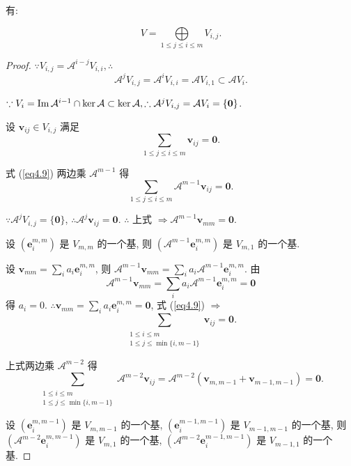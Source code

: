 \documentclass{ctexart}
\begin{document}
有:
\begin{theorem}\label{t4.3}
    \[V=\bigoplus\limits_{1\leq j\leq i\leq m}V_{i,j}.\]
\end{theorem}
\begin{proof}
    $\because V_{i,j}=\mathcal{A}^{i-j}V_{i,i},\therefore$
    \[\mathcal{A}^jV_{i,j}=\mathcal{A}^iV_{i,i}=\mathcal{A}V_{i,1}\subset\mathcal{A}V_i.\]

    $\because V_i=\operatorname{Im} \mathcal{A}^{i-1}\cap\ker\mathcal{A}\subset\ker\mathcal{A},\therefore\mathcal{A}^jV_{i,j}=\mathcal{A}V_i=\{\boldsymbol{0}\}$.

    设 $\boldsymbol{v}_{ij}\in V_{i,j}$ 满足
    \begin{equation}\label{eq4.9}
        \sum\limits_{1\leq j\leq i\leq m}\boldsymbol{v}_{ij}=\boldsymbol{0}.
    \end{equation}

    式 (\ref{eq4.9}) 两边乘 $\mathcal{A}^{m-1}$ 得
    \[\sum\limits_{1\leq j\leq i\leq m}\mathcal{A}^{m-1}\boldsymbol{v}_{ij}=\boldsymbol{0}.\]

    $\because\mathcal{A}^jV_{i,j}=\{\boldsymbol{0}\}$, $\therefore\mathcal{A}^j\boldsymbol{v}_{ij}=\boldsymbol{0}$. $\therefore$ 上式 $\Rightarrow\mathcal{A}^{m-1}\boldsymbol{v}_{mm}=\boldsymbol{0}$.

    设 $(\boldsymbol{e}_i^{m,m})$ 是 $V_{m,m}$ 的一个基, 则 $(\mathcal{A}^{m-1}\boldsymbol{e}_i^{m,m})$ 是 $V_{m,1}$ 的一个基.
    
    设 $\boldsymbol{v}_{mm}=\sum\limits_ia_i\boldsymbol{e}_i^{m,m}$, 则 $\mathcal{A}^{m-1}\boldsymbol{v}_{mm}=\sum\limits_ia_i\mathcal{A}^{m-1}\boldsymbol{e}_i^{m,m}$. 由
    \[\mathcal{A}^{m-1}\boldsymbol{v}_{mm}=\sum\limits_ia_i\mathcal{A}^{m-1}\boldsymbol{e}_i^{m,m}=\boldsymbol{0}\]
    得 $a_i=0$. $\therefore \boldsymbol{v}_{mm}=\sum\limits_ia_i\boldsymbol{e}_i^{m,m}=\boldsymbol{0}$, 式 (\ref{eq4.9}) $\Rightarrow$
    \[\sum\limits_{\substack{1\leq i\leq m\\1\leq j\leq\min\{i,m-1\}}}\boldsymbol{v}_{ij}=\boldsymbol{0}.\]
    
    上式两边乘 $\mathcal{A}^{m-2}$ 得
    \[\sum\limits_{\substack{1\leq i\leq m\\1\leq j\leq\min\{i,m-1\}}}\mathcal{A}^{m-2}\boldsymbol{v}_{ij}=\mathcal{A}^{m-2}(\boldsymbol{v}_{m,m-1}+\boldsymbol{v}_{m-1,m-1})=\boldsymbol{0}.\]

    设 $(\boldsymbol{e}_i^{m,m-1})$ 是 $V_{m,m-1}$ 的一个基, $(\boldsymbol{e}_i^{m-1,m-1})$ 是 $V_{m-1,m-1}$ 的一个基, 则 $(\mathcal{A}^{m-2}\boldsymbol{e}_i^{m,m-1})$ 是 $V_{m,1}$ 的一个基, $(\mathcal{A}^{m-2}\boldsymbol{e}_i^{m-1,m-1})$ 是 $V_{m-1,1}$ 的一个基.


\end{proof}
\end{document}
